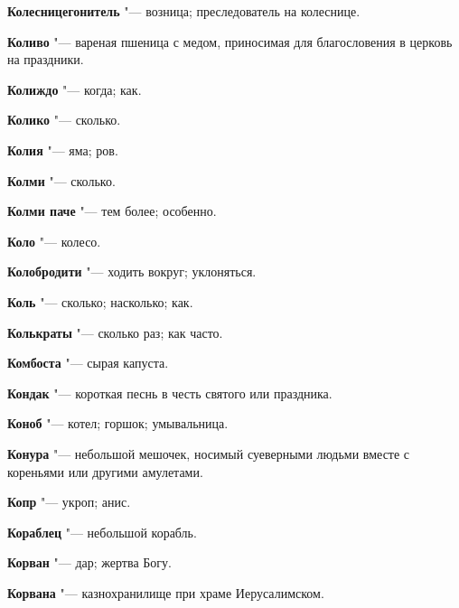 \begin{mymulticols}{2}
\noindent\textbf{Колесницегонитель} "--- возница; преследователь на колеснице. 




\noindent\textbf{Коливо} "--- вареная пшеница с медом, приносимая для благословения в церковь на праздники. 




\noindent\textbf{Колиждо} "--- когда; как. 




\noindent\textbf{Колико} "--- сколько. 




\noindent\textbf{Колия} "--- яма; ров. 




\noindent\textbf{Колми} "--- сколько. 




\noindent\textbf{Колми паче} "--- тем более; особенно. 




\noindent\textbf{Коло} "--- колесо. 




\noindent\textbf{Колобродити} "--- ходить вокруг; уклоняться. 




\noindent\textbf{Коль} "--- сколько; насколько; как. 




\noindent\textbf{Колькраты} "--- сколько раз; как часто. 




\noindent\textbf{Комбоста} "--- сырая капуста. 




\noindent\textbf{Кондак} "--- короткая песнь в честь святого или праздника. 




\noindent\textbf{Коноб} "--- котел; горшок; умывальница. 




\noindent\textbf{Конура} "--- небольшой мешочек, носимый суеверными людьми вместе с кореньями или другими амулетами. 




\noindent\textbf{Копр} "--- укроп; анис. 




\noindent\textbf{Кораблец} "--- небольшой корабль. 




\noindent\textbf{Корван} "--- дар; жертва Богу. 




\noindent\textbf{Корвана} "--- казнохранилище при храме Иерусалимском. 





\end{mymulticols}
